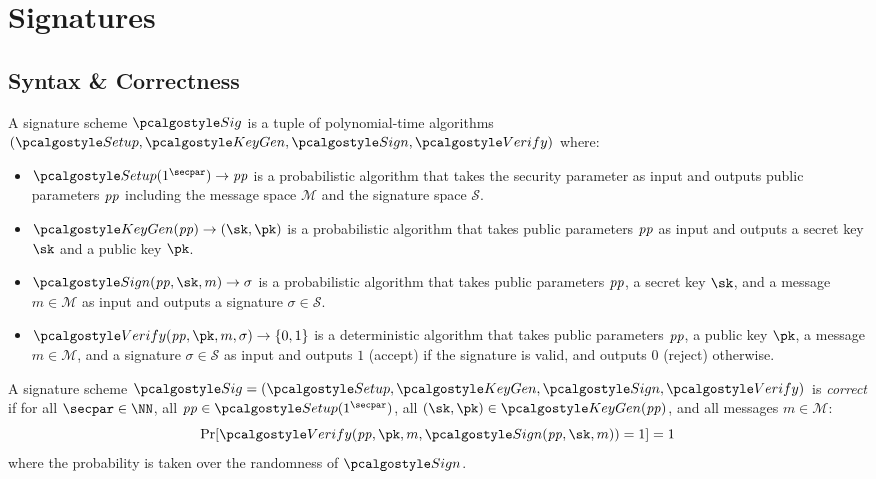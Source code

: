 \section{Signatures}\label{sec:signatures}

\subsection{Syntax \& Correctness}

\begin{definition}
  A signature scheme $\algo{Sig}$ is a tuple of polynomial-time algorithms $(\algo{Setup}, \algo{KeyGen}, \algo{Sign}, \algo{Verify})$ where:
  \begin{itemize}
    \item $\algo{Setup}(1^\secpar) \rightarrow \params$ is a probabilistic algorithm that takes the security parameter as input and outputs public parameters $\mathit{pp}$ including the message space $\mathcal{M}$ and the signature space $\mathcal{S}$.
    \item $\algo{KeyGen}(\params) \rightarrow (\sk, \pk)$ is a probabilistic algorithm that takes public parameters $\mathit{pp}$ as input and outputs a secret key $\sk$ and a public key $\pk$.
    \item $\algo{Sign}(\params, \sk, m) \rightarrow \sigma$ is a probabilistic algorithm that takes public parameters $\mathit{pp}$, a secret key $\sk$, and a message $m \in \mathcal{M}$ as input and outputs a signature $\sigma \in \mathcal{S}$.
    \item $\algo{Verify}(\params, \pk, m, \sigma) \rightarrow \{0, 1\}$ is a deterministic algorithm that takes public parameters $\mathit{pp}$, a public key $\pk$, a message $m \in \mathcal{M}$, and a signature $\sigma \in \mathcal{S}$ as input and outputs $1$ (accept) if the signature is valid, and outputs $0$ (reject) otherwise.
  \end{itemize}
\end{definition}

\begin{definition}[Correctness]\label{def:sig-correctness}
  A signature scheme $\algo{Sig} = (\algo{Setup}, \algo{KeyGen}, \algo{Sign}, \algo{Verify})$ is \emph{correct} if for all $\secpar \in \NN$, all $\params \in \algo{Setup}(1^\secpar)$, all $(\sk, \pk) \in \algo{KeyGen}(\params)$, and all messages $m \in \mathcal{M}$:
  \[
    \Pr[\algo{Verify}(\params, \pk, m, \algo{Sign}(\params, \sk, m)) = 1] = 1
  \]
  where the probability is taken over the randomness of $\algo{Sign}$.
\end{definition}

